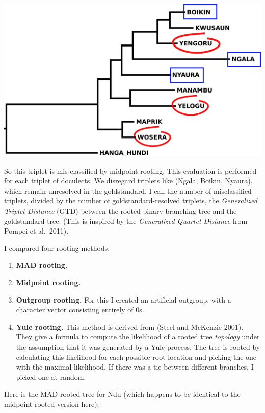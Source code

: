 \documentclass[
  a4paper,
  14pt,
  oneside,
  tablecaptionabove
]{scrbook}
\begin{document}
{\includegraphics[width=5.27083in,height=3.10417in]{images/Ndu.midpointRooted.triplets.jpg}}

{So this triplet is mis-classified by midpoint rooting. This evaluation
is performed for each triplet of doculects. We disregard triplets like
(Ngala, Boikin, Nyaura), which remain unresolved in the goldstandard. I
call the number of misclassified triplets, divided by the number of
goldstandard-resolved triplets, the \emph{Generalized Triplet Distance}
(GTD) between the rooted binary-branching tree and the goldstandard
tree. (This is inspired by the \emph{Generalized Quartet Distance} from
Pompei et al.~2011).}

{I compared four rooting methods:}

\begin{enumerate}
\def\labelenumi{\arabic{enumi}.}
\item
  {\textbf{MAD rooting.}}
\item
  {\textbf{Midpoint rooting.}}
\item
  {\textbf{Outgroup rooting.} For this I created an artificial outgroup,
  with a character vector consisting entirely of 0s.}
\item
  {\textbf{Yule rooting.} This method is derived from (Steel and
  McKenzie 2001). They give a formula to compute the likelihood of a
  rooted tree \emph{topology} under the assumption that it was generated
  by a Yule process. The tree is rooted by calculating this likelihood
  for each possible root location and picking the one with the maximal
  likelihood. If there was a tie between different branches, I picked
  one at random.}
\end{enumerate}

{Here is the MAD rooted tree for Ndu (which happens to be identical to
the midpoint rooted version here):}
\end{document}
